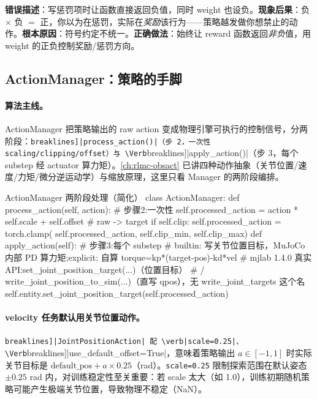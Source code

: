 \begin{pitfall}
\textbf{错误描述}：写惩罚项时让函数直接返回负值，同时 weight 也设负。\textbf{现象后果}：负 $\times$ 负 $=$ 正，你以为在惩罚，实际在\emph{奖励}该行为——策略越发做你想禁止的动作。\textbf{根本原因}：符号约定不统一。\textbf{正确做法}：始终让 reward 函数返回\emph{非负}值，用 weight 的正负控制奖励/惩罚方向。
\end{pitfall}

\subsection{ActionManager：策略的手脚}
\label{sec:rlmc-mgr-action}

\paragraph{算法主线。}ActionManager 把策略输出的 raw action 变成物理引擎可执行的控制信号，分两阶段：\Verb[breaklines]|process_action()|（步 2，一次性 scaling/clipping/offset）与 \Verb[breaklines]|apply_action()|（步 3，每个 substep 经 actuator 算力矩）。\cref{ch:rlmc-obsact} 已讲四种动作抽象（关节位置/速度/力矩/微分逆运动学）与缩放原理，这里只看 Manager 的两阶段编排。

\begin{codebox}[Python]{ActionManager 两阶段处理（简化）}
class ActionManager:
    def process_action(self, action):                 # 步骤2:一次性
        self.processed_action = action * self.scale + self.offset   # raw -> target
        if self.clip:
            self.processed_action = torch.clamp(
                self.processed_action, self.clip_min, self.clip_max)
    def apply_action(self):                           # 步骤3:每个 substep
        # builtin: 写关节位置目标，MuJoCo 内部 PD 算力矩;explicit: 自算 torque=kp*(target-pos)-kd*vel
        # mjlab 1.4.0 真实 API:set_joint_position_target(...)（位置目标）
        #   / write_joint_position_to_sim(...)（直写 qpos），无 write_joint_targets 这个名
        self.entity.set_joint_position_target(self.processed_action)
\end{codebox}

\paragraph{velocity 任务默认用关节位置动作。}\Verb[breaklines]|JointPositionAction| 配 \verb|scale=0.25|、\Verb[breaklines]|use_default_offset=True|，意味着策略输出 $a\in[-1,1]$ 时实际关节目标是 $\text{default\_pos}+a\times0.25$（rad）。\verb|scale=0.25| 限制探索范围在默认姿态 $\pm 0.25$ rad 内，对训练稳定性至关重要：若 scale 太大（如 1.0），训练初期随机策略可能产生极端关节位置，导致物理不稳定（NaN）。

